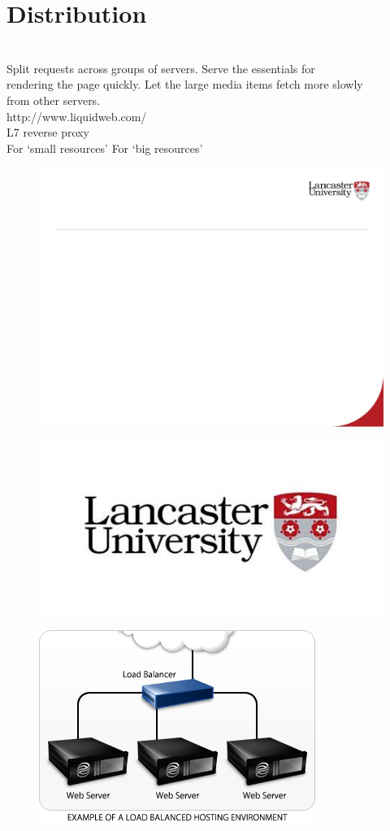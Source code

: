 \documentclass[12pt]{article}
\begin{document}
\section{Distribution}
\\
Split requests across groups of servers. Serve the essentials for \\
rendering the page quickly.  Let the large media items fetch more slowly \\
from other servers.\\
http://www.liquidweb.com/\\
L7 reverse proxy\\
For ‘small resources’ For ‘big resources’\\
\begin{figure}[H]
\includegraphics[width=0.5\linewidth]{page79-image-1.png}
\end{figure}
\begin{figure}[H]
\includegraphics[width=0.5\linewidth]{page79-image-2.png}
\end{figure}
\begin{figure}[H]
\includegraphics[width=0.5\linewidth]{page79-image-3.png}
\end{figure}
\end{document}
